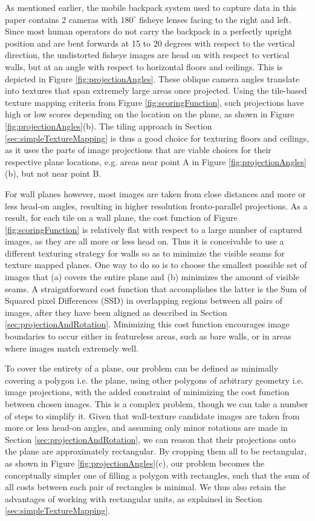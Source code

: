 \documentclass[10pt,twocolumn,letterpaper]{article}
\begin{document}
As mentioned earlier, the mobile backpack system used to capture data
in this paper contains 2 cameras with $180^\circ$ fisheye lenses
facing to the right and left. Since most human operators do not carry
the backpack in a perfectly upright position and are bent forwards at
15 to 20 degrees with respect to the vertical direction, the
undistorted fisheye images are head on with respect to vertical walls,
but at an angle with respect to horizontal floors and ceilings. This
is depicted in Figure \ref{fig:projectionAngles}. These oblique camera
angles translate into textures that span extremely large areas once
projected. Using the tile-based texture mapping criteria from Figure
\ref{fig:scoringFunction}, such projections have high or low scores
depending on the location on the plane, as shown in Figure
\ref{fig:projectionAngles}(b). The tiling approach in Section
\ref{sec:simpleTextureMapping} is thus a good choice for texturing
floors and ceilings, as it uses the parts of image projections that
are viable choices for their respective plane locations, e.g. areas
near point A in Figure \ref{fig:projectionAngles}(b), but not near
point B.

For wall planes however, most images are taken from close distances
and more or less head-on angles, resulting in higher resolution
fronto-parallel projections. As a result, for each tile on a wall
plane, the cost function of Figure \ref{fig:scoringFunction} is
relatively flat with respect to a large number of captured images, as
they are all more or less head on. Thus it is conceivable to use a
different texturing strategy for walls so as to minimize the visible
seams for texture mapped planes. One way to do so is to choose the
smallest possible set of images that (a) covers the entire plane and
(b) minimizes the amount of visible seams. A straigntforward cost
function that accomplishes the latter is the Sum of Squared pixel
Differences (SSD) in overlapping regions between all pairs of images,
after they have been aligned as described in Section
\ref{sec:projectionAndRotation}. Minimizing this cost function
encourages image boundaries to occur either in featureless areas, such
as bare walls, or in areas where images match extremely well.

To cover the entirety of a plane, our problem can be defined as
minimally covering a polygon i.e. the plane, using other polygons of
arbitrary geometry i.e. image projections, with the added constraint
of minimizing the cost function between chosen images.  This is a
complex problem, though we can take a number of steps to simplify
it. Given that wall-texture candidate images are taken from more or
less head-on angles, and assuming only minor rotations are made in
Section \ref{sec:projectionAndRotation}, we can reason that their
projections onto the plane are approximately rectangular. By cropping
them all to be rectangular, as shown in Figure
\ref{fig:projectionAngles}(c), our problem becomes the conceptually
simpler one of filling a polygon with rectangles, such that the sum of
all costs between each pair of rectangles is minimal. We thus also
retain the advantages of working with rectangular units, as explained
in Section \ref{sec:simpleTextureMapping}.
\end{document}
